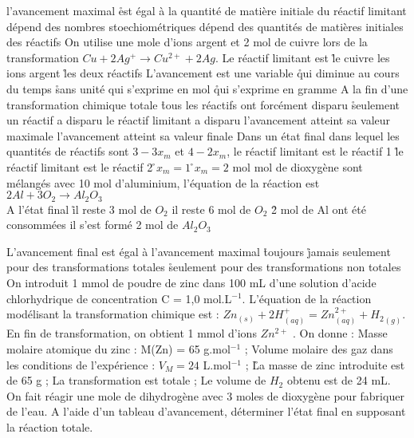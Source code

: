 \q l'avancement maximal 
\r est égal à la quantité de matière initiale du réactif limitant 
\rv dépend des nombres stoechiométriques 
\rv dépend des quantités de matières initiales des réactifs 
\q On utilise une mole d'ions argent et 2 mol de cuivre lors de la transformation $Cu+2Ag^+\longrightarrow Cu^{2+}+2Ag$. Le réactif limitant est 
\r le cuivre 
\rv les ions argent 
\r les deux réactifs 
L'avancement est une variable 
\r qui diminue au cours du temps 
\r sans unité 
\rv qui s'exprime en mol 
\r qui s'exprime en gramme 
\q A la fin d'une transformation chimique totale
\r tous les réactifs ont forcément disparu
\r  seulement un réactif a disparu 
\rv le réactif limitant a disparu 
\rv l'avancement atteint sa valeur maximale
\rv l'avancement atteint sa valeur finale 
\q Dans un état final dans lequel les quantités de réactifs sont $3 - 3 x_m$ et $4 - 2 x_m$,  
\rv le réactif limitant est le réactif 1 
\r le réactif limitant est le réactif 2
\r $x_m=1$ 
\r $x_m=2$ mol 
 mol de dioxygène sont mélangés avec 10 mol d'aluminium, l'équation de la réaction est $2Al+3O_2\rightarrow Al_2O_3$\\ A l'état final 
\r il reste 3 mol de $O_2$ 
\rv il reste 6 mol de $O_2$ 
\r 2 mol de Al ont été consommées
\rv il s'est formé 2 mol de $Al_2O_3$

\q L'avancement final est égal à l'avancement maximal 
\r toujours 
\r jamais 
\rv seulement pour des transformations totales 
\r seulement pour des transformations non totales
\q	
On introduit 1 mmol de poudre de zinc dans 100 mL d’une solution d’acide chlorhydrique de concentration C = 1,0 mol.L$^{-1}$. L’équation de la réaction modélisant la transformation chimique est : $Zn_{(s)} + 2 H^+_{(aq)} = Zn^{2+}_{(aq)} + {H_2}_{(g)} $.
En fin de transformation, on obtient 1 mmol d’ions $Zn^{2+}$ .
On donne : 	Masse molaire atomique du zinc : M(Zn) = 65 g.mol$^{-1}$ ;
Volume molaire des gaz dans les conditions de l'expérience : $V_M = 24$ L.mol$^{-1}$ ; 
\r
La masse de zinc introduite est de 65 g ;
\rv
La transformation est totale ;
\rv
Le volume de $H_2$ obtenu est de 24 mL.
\q On fait réagir une mole de dihydrogène avec 3 moles de dioxygène pour fabriquer de l'eau. A l'aide d'un tableau d'avancement, déterminer l'état final en supposant la réaction totale.
